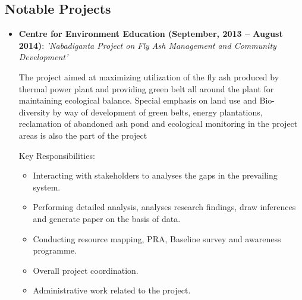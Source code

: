 \documentclass[11pt,a4paper,sans]{moderncv}
\begin{document}
\subsection{Notable Projects}
\begin{itemize}
\item{\textbf{Centre for Environment Education (September, 2013 – August 2014)}: \textit{'Nabadiganta Project on Fly Ash Management and Community Development'}

      \vspace{3pt}

The project aimed at maximizing utilization of the fly ash produced by thermal power plant and providing green belt all around the plant
for maintaining ecological balance. Special emphasis on land use and Bio-diversity by way of development of green belts, energy plantations,
reclamation of abandoned ash pond and ecological monitoring in the project areas is also the part of the project}

Key Responsibilities:
    \begin{itemize}
        \item Interacting with stakeholders to analyses the gaps in the prevailing system.
        \item Performing detailed analysis, analyses research findings, draw inferences and generate paper on the basis of data.
        \item Conducting resource mapping, PRA, Baseline survey and awareness programme.
        \item Overall project coordination.
        \item Administrative work related to the project.
    \end{itemize}
\end{itemize}

\vspace{5pt}
\end{document}

